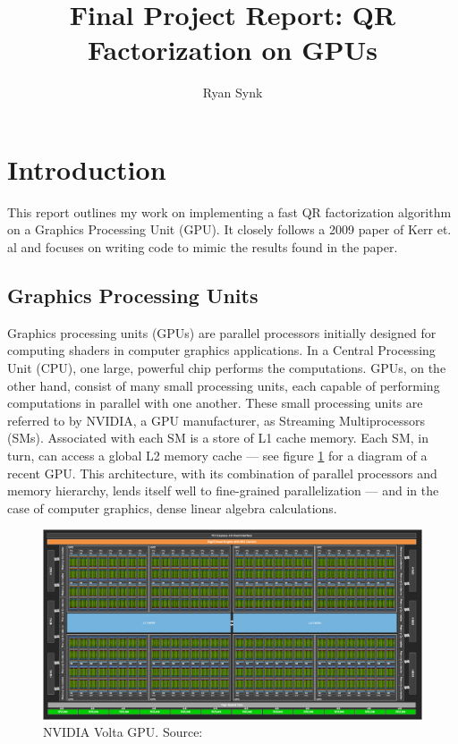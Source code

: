 \documentclass[12pt]{article}
\title{Final Project Report: QR Factorization on GPUs}
\author{Ryan Synk}
\begin{document}
\maketitle

\section*{Introduction}

This report outlines my work on implementing a fast QR factorization algorithm on a Graphics
Processing Unit (GPU). It closely follows a 2009 paper of Kerr et. al 
\cite{10.1145/1513895.1513904} and focuses on writing code to mimic the results found
in the paper.

\subsection*{Graphics Processing Units}

Graphics processing units (GPUs) are parallel processors initially designed for computing shaders
in computer graphics applications. In a Central Processing Unit (CPU), one large, powerful chip 
performs the computations. GPUs, on the other hand, consist of many small processing units, 
each capable of performing computations in parallel with one another. These small processing
units are referred to by NVIDIA, a GPU manufacturer, as Streaming Multiprocessors (SMs). 
Associated with each SM is a store of L1 cache memory. Each SM, in turn, can access a global 
L2 memory cache --- see figure \ref{fig:gpudiagram} for a diagram of a recent GPU. This 
architecture, with its combination of parallel processors and memory hierarchy, lends 
itself well to fine-grained parallelization --- and in the case of computer graphics, dense 
linear algebra calculations.

\begin{figure}[H]
    \includegraphics[scale=0.20]{gpu_diagram}
    \caption{NVIDIA Volta GPU. Source: \cite{volta_blogpost}}
    \label{fig:gpudiagram}
\end{figure}
\end{document}
